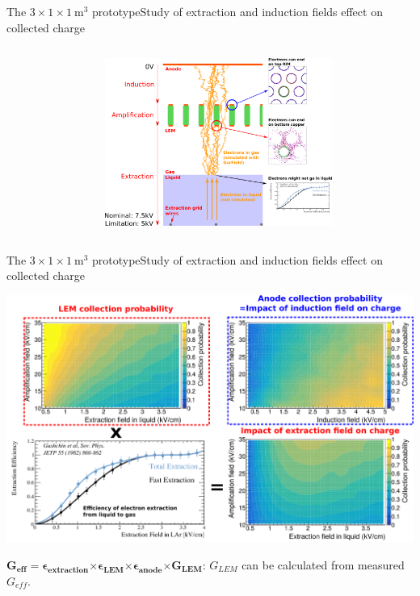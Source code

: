 \documentclass[10pt]{beamer}
\begin{document}
\begin{frame}{The \texorpdfstring{$3 \times 1 \times \SI{1}{\meter\cubed}$}{311} prototype}{Study of extraction and induction fields effect on collected charge}
\begin{scriptsize}
\begin{columns}
\begin{column}{0.45\textwidth}
	    		\end{column}\hspace{-1.9cm}
	    		\begin{column}{0.55\textwidth}
	    			\includegraphics[height=5.5cm]{figures/311/coll_proba_2.png}\\
	    		\end{column}
	    	\end{columns}
    	\end{scriptsize} 
    \end{frame}
    
    \begin{frame}{The \texorpdfstring{$3 \times 1 \times \SI{1}{\meter\cubed}$}{311} prototype}{Study of extraction and induction fields effect on collected charge}
    	\begin{scriptsize}
    		\centering \includegraphics[width=\textwidth]{figures/311/effs.png}\\
    		\begin{center}
    			$\mathbf{G_{eff}=\boldsymbol{\epsilon}_{extraction} \boldsymbol{\times} \boldsymbol{\epsilon}_{LEM} \boldsymbol{\times} \boldsymbol{\epsilon}_{anode} \boldsymbol{\times} G_{LEM}}$: $G_{LEM}$ can be calculated from measured $G_{eff}$.
    		\end{center}
    	\end{scriptsize} 
    \end{frame}
    
\end{document}
